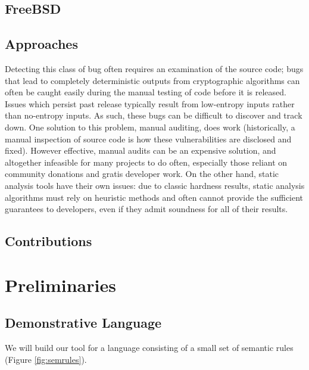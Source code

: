 \documentclass[letterpaper,twocolumn,10pt]{article}
\begin{document}
\cite{schneier2008}

\subsection{FreeBSD}

\cite{hovav2016}

\subsection{Approaches}

Detecting this class of bug often requires an examination of the source code; 
bugs that lead to completely deterministic outputs
 from cryptographic algorithms can often be caught easily during the manual
 testing of code before it is released. Issues which persist past release
 typically result from low-entropy inputs rather than no-entropy inputs.
 As such, these bugs can be difficult to discover and track down. One solution
 to this problem, manual auditing, does work (historically, a manual
 inspection of source code is how these vulnerabilities are disclosed and fixed).
 However effective, manual audits can be an expensive solution, and altogether 
 infeasible
 for many projects to do often, especially those reliant on community donations and gratis
 developer work. On the other hand, static analysis tools have their own issues:
 due to classic hardness results, static analysis algorithms must rely on heuristic
 methods and often cannot provide the sufficient guarantees to developers, even
 if they admit soundness for all of their results.
 
 \subsection{Contributions}





\section{Preliminaries}

\subsection{Demonstrative Language}

We will build our tool for a language consisting of a small set of semantic rules (Figure \ref{fig:semrules}).
\end{document}
